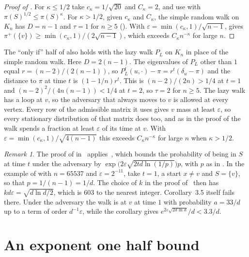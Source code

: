 \documentclass[11pt]{article}
\theoremstyle{remark}
\newtheorem{remark}[theorem]{Remark}
\theoremstyle{plain}
\begin{document}
\begin{proof}[Proof of ]
For $\kappa\le1/2$ take $c_\kappa=1/\sqrt{20}$ and $C_\kappa=2$, and use  with
$\pi(S)^{1/2}\le\pi(S)^\kappa$. For $\kappa>1/2$, given $c_\kappa$ and $C_\kappa$, the simple random walk on $K_n$ has
$D=n-1$ and $\tau=1$ for $n\ge5$ (). With $\varepsilon=\min(c_\kappa,1)/\sqrt{n-1}$, 
gives $\pi^+(\{v\})\ge\min(c_\kappa,1)/(2\sqrt{n-1})$, which exceeds $C_\kappa n^{-\kappa}$ for large $n$.
\end{proof}

The ``only if'' half of  also holds with the lazy walk $P_L$ on $K_n$ in place of the simple
random walk. Here $D=2(n-1)$. The eigenvalues of $P_L$ other than $1$ equal $r=(n-2)/(2(n-1))$, so
$P_L^t(u,\cdot)-\pi=r^t(\delta_u-\pi)$ and the distance to $\pi$ at time $t$ is $(1-1/n)r^t$. This is
$(n-2)/(2n)>1/4$ at $t=1$ and $(n-2)^2/(4n(n-1))<1/4$ at $t=2$, so $\tau=2$ for $n\ge5$. The lazy walk has a loop at
$v$, so the adversary that always moves to $v$ is allowed at every vertex. Every row of the admissible matrix it uses
gives $v$ mass at least $\varepsilon$, so every stationary distribution of that matrix does too, and as in the proof
of  the walk spends a fraction at least $\varepsilon$ of its time at $v$. With
$\varepsilon=\min(c_\kappa,1)/\sqrt{4(n-1)}$ this exceeds $C_\kappa n^{-\kappa}$ for large $n$ when $\kappa>1/2$.

\begin{remark}\label{rem:where}
The proof of  in~\cite{Zu} applies~\cite[Corollary~3.5]{Zu}, which bounds the probability of being in
$S$ at time $t$ under the adversary by $\exp\bigl(2\varepsilon\sqrt{2td\ln(1/p)}\bigr)p$, with $p$ as in
. In the example of  with $n=65537$ and $\varepsilon=2^{-11}$, take $t=1$, a start
$x\ne v$ and $S=\{v\}$, so that $p=1/(n-1)=1/d$. The choice of $k$ in the proof of~\cite[Corollary~3.5]{Zu} then has
$kd\varepsilon=\sqrt{d\ln d/2}$, which is $603$ to the nearest integer. Corollary~3.5 itself fails there. Under the
adversary the walk is at $v$ at time $1$ with probability $a=33/d$ up to a term of order $d^{-1}\varepsilon$, while the
corollary gives $e^{2\varepsilon\sqrt{2d\ln d}}/d<3.3/d$.
\end{remark}

\section{An exponent one half bound}\label{sec:half}
\end{document}
